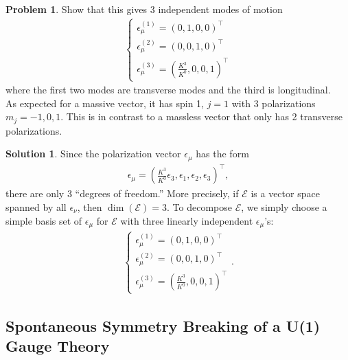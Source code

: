 \documentclass[a4paper,11pt]{article}
\numberwithin{equation}{section}
\theoremstyle{definition}
\newtheorem{prob}{Problem}[section]
\newtheorem{sln}{Solution}[section]
\begin{document}
\begin{prob}
	Show that this gives 3 independent modes of motion
	\begin{align}
	\begin{cases}
	\epsilon^{(1)}_\mu = (0,1,0,0)^\top\\
	\epsilon^{(2)}_\mu = (0,0,1,0)^\top\\
	\epsilon^{(3)}_\mu = \left(\frac{K^3}{K^0},0,0,1\right)^\top
	\end{cases}
	\end{align}
	where the first two modes are transverse modes and the third is longitudinal.\\
	
	As expected for a massive vector, it has spin 1, $j=1$ with 3 polarizations $m_j = -1,0,1$. This is in contrast to a massless vector that only has 2 transverse polarizations. \\
	
	\begin{sln}
		Since the polarization vector $\epsilon_\mu$ has the form
		\begin{align}
		\epsilon_\mu = \left(\frac{K^3}{K^0}\epsilon_3,\epsilon_1,\epsilon_2,\epsilon_3 \right)^\top,
		\end{align}
		there are only 3 ``degrees of freedom.'' More precisely, if $\mathcal{E}$ is a vector space spanned by all $\epsilon_\nu$, then $\dim(\mathcal{E}) = 3$. To decompose $\mathcal{E}$, we simply choose a simple basis set of $\epsilon_\mu$ for $\mathcal{E}$ with three linearly independent $\epsilon_\mu$'s:
		\begin{align}
		\begin{cases}
		\epsilon^{(1)}_\mu = (0,1,0,0)^\top\\
		\epsilon^{(2)}_\mu = (0,0,1,0)^\top\\
		\epsilon^{(3)}_\mu = \left(\frac{K^3}{K^0},0,0,1\right)^\top
		\end{cases}.
		\end{align}
	\end{sln}
\end{prob}













\newpage






\subsection{Spontaneous Symmetry Breaking of a U(1) Gauge Theory}
\end{document}
